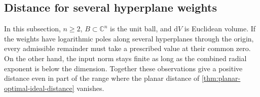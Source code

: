 \subsection{Distance for several hyperplane weights}
\label{subsec:psh-hyperplane-ideal-distance}

In this subsection, $n\geq2$, $B\subset\mathbb C^n$ is the unit ball, and $\mathrm{d}V$ is Euclidean volume. If the weights have logarithmic poles along several hyperplanes through the origin, every admissible remainder must take a prescribed value at their common zero. On the other hand, the input norm stays finite as long as the combined radial exponent is below the dimension. Together these observations give a positive distance even in part of the range where the planar distance of \cref{thm:planar-optimal-ideal-distance} vanishes.

